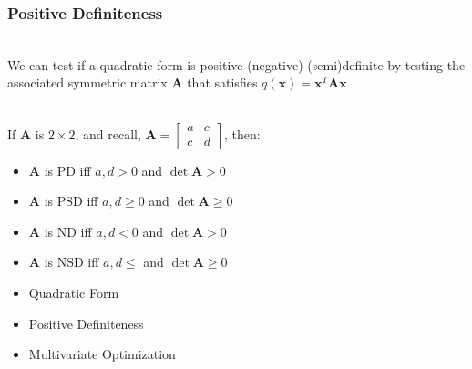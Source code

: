 \documentclass[handout]{beamer}
\numberwithin{equation}{section}
\begin{document}
\begin{frame}
\frametitle{Positive Definiteness}

\ \\We can test if a quadratic form is positive (negative) (semi)definite by testing the associated symmetric matrix $\mathbf{A}$ that satisfies $q(\mathbf{x})=\mathbf{x}^T\mathbf{A}\mathbf{x}$ \pause

\ \\If $\mathbf{A}$ is $2\times 2$, and recall, $\mathbf{A}=\begin{bmatrix}a& c\\c& d\end{bmatrix}$, then: \pause

\begin{itemize}
\item $\mathbf{A}$ is PD iff $a, d>0$ and $\det \mathbf{A}>0$ \pause
\item $\mathbf{A}$ is PSD iff  $a, d\geq0$ and $\det \mathbf{A}\geq 0$ \pause
\item $\mathbf{A}$ is ND iff $a, d<0$ and $\det \mathbf{A}>0$ \pause
\item $\mathbf{A}$ is NSD iff  $a, d\leq $ and $\det \mathbf{A}\geq 0$
\end{itemize}

\end{frame}



\begin{frame}

\begin{itemize}
\item \textcolor{mygray}{Quadratic Form}
\item \textcolor{mygray}{Positive Definiteness}
\item \textcolor{myblack}{Multivariate Optimization}
\end{itemize}

\end{frame}
\end{document}
